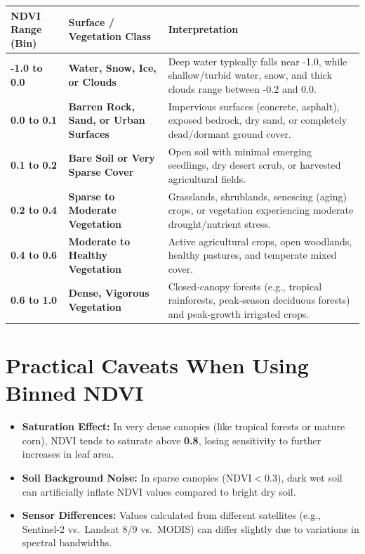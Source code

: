 \documentclass[11pt,a4paper]{article}
\begin{document}
\begin{table}[h!]
\centering
\renewcommand{\arraystretch}{1.35}
\begin{tabularx}{\textwidth}{@{} l l X @{}}
\toprule
\textbf{NDVI Range (Bin)} & \textbf{Surface / Vegetation Class} & \textbf{Interpretation} \\
\midrule
\textbf{-1.0 to 0.0} & \textbf{Water, Snow, Ice, or Clouds} & Deep water typically falls near -1.0, while shallow/turbid water, snow, and thick clouds range between -0.2 and 0.0. \\
\textbf{0.0 to 0.1} & \textbf{Barren Rock, Sand, or Urban Surfaces} & Impervious surfaces (concrete, asphalt), exposed bedrock, dry sand, or completely dead/dormant ground cover. \\
\textbf{0.1 to 0.2} & \textbf{Bare Soil or Very Sparse Cover} & Open soil with minimal emerging seedlings, dry desert scrub, or harvested agricultural fields. \\
\textbf{0.2 to 0.4} & \textbf{Sparse to Moderate Vegetation} & Grasslands, shrublands, senescing (aging) crops, or vegetation experiencing moderate drought/nutrient stress. \\
\textbf{0.4 to 0.6} & \textbf{Moderate to Healthy Vegetation} & Active agricultural crops, open woodlands, healthy pastures, and temperate mixed cover. \\
\textbf{0.6 to 1.0} & \textbf{Dense, Vigorous Vegetation} & Closed-canopy forests (e.g., tropical rainforests, peak-season deciduous forests) and peak-growth irrigated crops. \\
\bottomrule
\end{tabularx}
\end{table}

\section*{Practical Caveats When Using Binned NDVI}
\begin{itemize}
    \item \textbf{Saturation Effect:} In very dense canopies (like tropical forests or mature corn), NDVI tends to saturate above \textbf{0.8}, losing sensitivity to further increases in leaf area.
    \item \textbf{Soil Background Noise:} In sparse canopies ($\text{NDVI} < 0.3$), dark wet soil can artificially inflate NDVI values compared to bright dry soil.
    \item \textbf{Sensor Differences:} Values calculated from different satellites (e.g., Sentinel-2 vs.\ Landsat 8/9 vs.\ MODIS) can differ slightly due to variations in spectral bandwidths.
\end{itemize}
\end{document}
